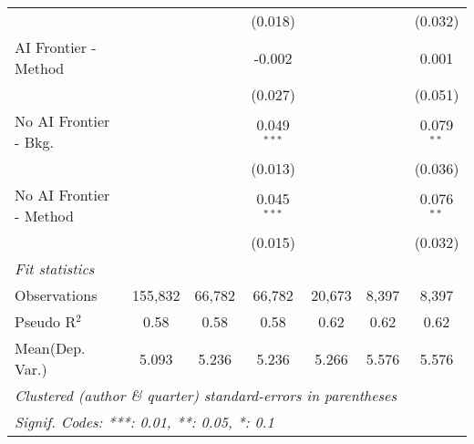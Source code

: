 \begin{tabular}{lcccccc}
                           &               &              & (0.018)       &               &              & (0.032)\\   
   AI Frontier - Method    &               &              & -0.002        &               &              & 0.001\\   
                           &               &              & (0.027)       &               &              & (0.051)\\   
   No AI Frontier - Bkg.   &               &              & 0.049$^{***}$ &               &              & 0.079$^{**}$\\   
                           &               &              & (0.013)       &               &              & (0.036)\\   
   No AI Frontier - Method &               &              & 0.045$^{***}$ &               &              & 0.076$^{**}$\\   
                           &               &              & (0.015)       &               &              & (0.032)\\   
   \midrule
   \emph{Fit statistics}\\
   Observations            & 155,832       & 66,782       & 66,782        & 20,673        & 8,397        & 8,397\\  
   Pseudo R$^2$            & 0.58          & 0.58         & 0.58          & 0.62          & 0.62         & 0.62\\  
Mean(Dep. Var.) & 5.093 & 5.236 & 5.236 & 5.266 & 5.576 & 5.576 \\
   \midrule \midrule
   \multicolumn{7}{l}{\emph{Clustered (author \& quarter) standard-errors in parentheses}}\\
   \multicolumn{7}{l}{\emph{Signif. Codes: ***: 0.01, **: 0.05, *: 0.1}}\\
\end{tabular}
\par\endgroup
